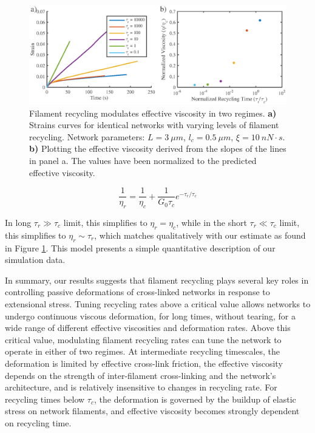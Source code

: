 \documentclass[10pt,letterpaper]{article}
\begin{document}
\begin{figure}[h!]
\centering
\includegraphics[width=\hsize]{figures/figure5a2}
\caption{\label{fig:passive_rec2}  Filament recycling modulates effective viscosity in two regimes.  \textbf{a)} Strains curves for identical networks with varying levels of filament recycling.  Network parameters: $L=3\: \mu m$, $l_c=0.5\: \mu m$, $\xi=10\: nN\cdot s$. \textbf{b)}  Plotting the effective viscosity derived from the slopes of the lines in panel a. The values have been normalized to the predicted effective viscosity. }
\end{figure}

\begin{equation}
\frac{1}{\eta_r} = \frac{1}{\eta_c}  + \frac{1}{G_0\tau_c}e^{-\tau_r/\tau_c}
\end{equation}

In long $\tau_r\gg\tau_c$ limit, this simplifies to $\eta_r=\eta_c$, while in the short $\tau_r\ll\tau_c$ limit, this simplifies to $\eta_r\sim\tau_r$, which matches qualitatively with our estimate as found in Figure \ref{fig:passive_rec2}.  This model presents a simple quantitative description of our simulation data.



In summary, our results suggests that filament recycling plays several key roles in controlling passive deformations of cross-linked networks in response to extensional stress.  Tuning recycling rates above a critical value allows networks to undergo continuous viscous deformation, for long times, without tearing, for a wide range of different effective viscosities and deformation rates. Above this critical value, modulating filament recycling rates can tune the network to operate in either of two regimes.  At intermediate recycling timescales, the deformation is limited by effective cross-link friction, the effective viscosity depends on the strength of inter-filament cross-linking and the network's architecture, and is relatively insensitive to changes in recycling rate. For recycling times below $\tau_c$, the deformation is governed by the buildup of elastic stress on network filaments, and effective viscosity becomes strongly dependent on recycling time. 
\end{document}
